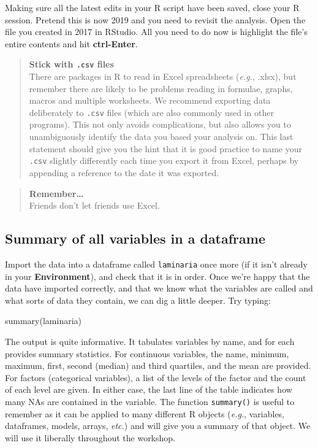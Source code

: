 \documentclass[
]{book}
\newenvironment{Shaded}{\begin{snugshade}}{\end{snugshade}}
\newcommand{\FunctionTok}[1]{\textcolor[rgb]{0.00,0.00,0.00}{#1}}
\newcommand{\NormalTok}[1]{#1}
\begin{document}
Making sure all the latest edits in your R script have been saved, close your R session. Pretend this is now 2019 and you need to revisit the analysis. Open the file you created in 2017 in RStudio. All you need to do now is highlight the file's entire contents and hit \textbf{ctrl-Enter}.

\begin{quote}
\textbf{Stick with \texttt{.csv} files}\\
There are packages in R to read in Excel spreadsheets (\emph{e.g.}, .xlsx), but remember there are likely to be problems reading in formulae, graphs, macros and multiple worksheets. We recommend exporting data deliberately to \texttt{.csv} files (which are also commonly used in other programs). This not only avoids complications, but also allows you to unambiguously identify the data you based your analysis on. This last statement should give you the hint that it is good practice to name your \texttt{.csv} slightly differently each time you export it from Excel, perhaps by appending a reference to the date it was exported.
\end{quote}

\begin{quote}
\textbf{Remember\ldots{}}\\
Friends don't let friends use Excel.
\end{quote}

\hypertarget{summary-of-all-variables-in-a-dataframe}{%
\subsection{Summary of all variables in a dataframe}\label{summary-of-all-variables-in-a-dataframe}}

Import the data into a dataframe called \texttt{laminaria} once more (if it isn't already in your \textbf{Environment}), and check that it is in order. Once we're happy that the data have imported correctly, and that we know what the variables are called and what sorts of data they contain, we can dig a little deeper. Try typing:

\begin{Shaded}
\begin{Highlighting}[]
\FunctionTok{summary}\NormalTok{(laminaria)}
\end{Highlighting}
\end{Shaded}

The output is quite informative. It tabulates variables by name, and for each provides summary statistics. For continuous variables, the name, minimum, maximum, first, second (median) and third quartiles, and the mean are provided. For factors (categorical variables), a list of the levels of the factor and the count of each level are given. In either case, the last line of the table indicates how many NAs are contained in the variable. The function \texttt{summary()} is useful to remember as it can be applied to many different R objects (\emph{e.g.}, variables, dataframes, models, arrays, \emph{etc.}) and will give you a summary of that object. We will use it liberally throughout the workshop.
\end{document}
